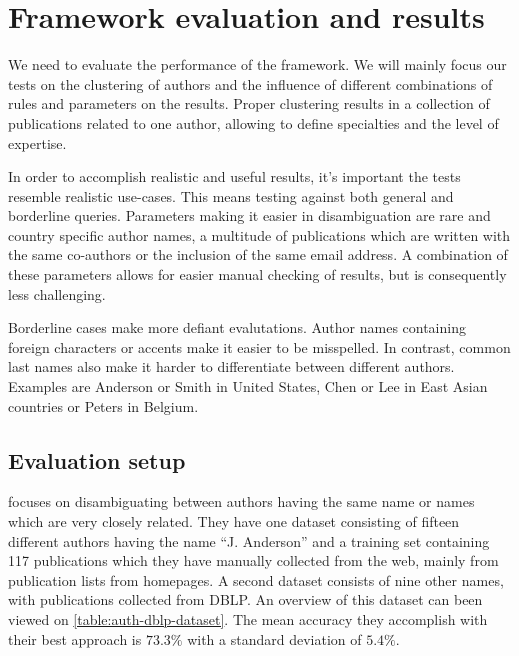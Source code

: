 \chapter{Framework evaluation and results}



We need to evaluate the performance of the framework. We will mainly focus our tests on the clustering of authors and the influence of different combinations of rules and parameters on the results. Proper clustering results in a collection of publications related to one author, allowing to define specialties and the level of expertise. 

In order to accomplish realistic and useful results, it's important the tests resemble realistic use-cases. This means testing against both general and borderline queries. Parameters making it easier in disambiguation are rare and country specific author names, a multitude of publications which are written with the same co-authors or the inclusion of the same email address. A combination of these parameters allows for easier manual checking of results, but is consequently less challenging. 

Borderline cases make more defiant evalutations. Author names containing foreign characters or accents make it easier to be misspelled. In contrast, common last names also make it harder to differentiate between different authors. Examples are Anderson or Smith in United States, Chen or Lee in East Asian countries or Peters in Belgium.




\section{Evaluation setup}

\cite{han2004two} focuses on disambiguating between authors having the same name or names which are very closely related. They have one dataset consisting of fifteen different authors having the name "`J. Anderson"' and a training set containing 117 publications which they have manually collected from the web, mainly from publication lists from homepages. A second dataset consists of nine other names, with publications collected from DBLP. An overview of this dataset can been viewed on \autoref{table:auth-dblp-dataset}. The mean accuracy they accomplish with their best approach is $73.3\%$ with a standard deviation of $5.4\%$.

